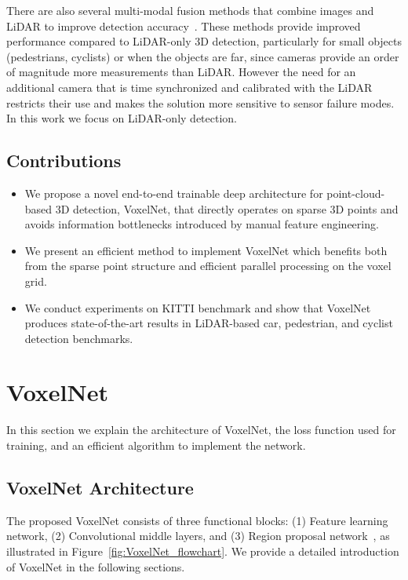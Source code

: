 \documentclass[10pt,twocolumn,letterpaper]{article}
\begin{document}
There are also several multi-modal fusion methods that combine images and LiDAR to improve detection accuracy~\cite{REF:Enzweiler2011,REF:Gonzalez2017,REF:cvpr17chen}. These methods provide improved performance compared to LiDAR-only 3D detection, particularly for small objects (pedestrians, cyclists) or when the objects are far, since cameras provide an order of magnitude more measurements than LiDAR. However the need for an additional camera that is time synchronized and calibrated with the LiDAR restricts their use and makes the solution more sensitive to sensor failure modes. In this work we focus on LiDAR-only detection.

\subsection{Contributions}


\begin{itemize}
	\item  We propose a novel end-to-end trainable deep architecture for point-cloud-based 3D detection, VoxelNet, that directly operates on sparse 3D points and avoids information bottlenecks introduced by manual feature engineering.
	\item We present an efficient method to implement VoxelNet which benefits both from the sparse point structure and efficient parallel processing on the voxel grid.
	\item We conduct experiments on KITTI benchmark and show that VoxelNet produces state-of-the-art results in LiDAR-based car, pedestrian, and cyclist detection benchmarks.
\end{itemize}




 



\section{VoxelNet}
\label{sec:VoxelNet}
In this section we explain the architecture of VoxelNet, the loss function used for training, and an efficient algorithm to implement the network.  

\subsection{VoxelNet Architecture} 
The proposed VoxelNet consists of three functional blocks: (1) Feature learning network, (2) Convolutional middle layers, and (3) Region proposal network~\cite{REF:NIPS2015_5638}, as illustrated in Figure~\ref{fig:VoxelNet_flowchart}. We provide a detailed introduction of VoxelNet in the following sections.
\end{document}
